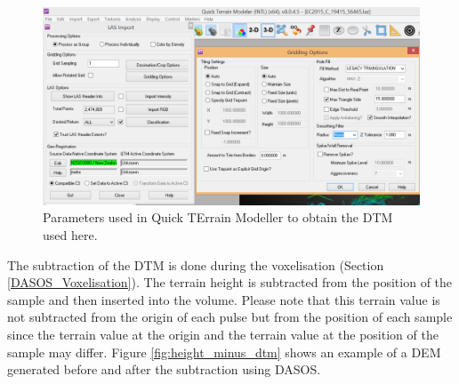 \documentclass{subfiles}
\begin{document}
\begin{figure} [h!]
	\centering
	\includegraphics[width=\textwidth]{img/dead/DTM_parameters}
	\caption{Parameters used in Quick TErrain Modeller to obtain the DTM used here.}
	\label{fig:DTM_parameters}
\end{figure}


\par The subtraction of the DTM is done during the voxelisation (Section \ref{DASOS_Voxelisation}). The terrain height is subtracted from the position of the sample and then inserted into the volume. Please note that this terrain value is not subtracted from the origin of each pulse but from the position of each sample since the terrain value at the origin and the terrain value at the position of the sample may differ. Figure \ref{fig:height_minus_dtm} shows an example of a DEM generated before and after the subtraction using DASOS. 
\end{document}
